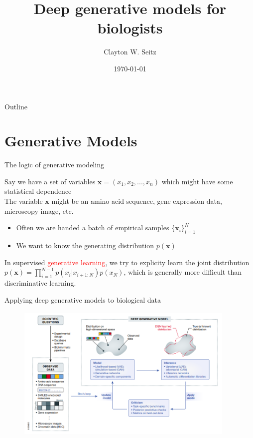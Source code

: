 \documentclass{beamer}					%
\title{Deep generative models for biologists}	%
\author{Clayton W. Seitz}								%
\date{\today}									%
\begin{document}
\begin{frame}
  \titlepage
\end{frame}

\begin{frame}{Outline}
  \tableofcontents
\end{frame}

%


\section{Generative Models}

\begin{frame}{The logic of generative modeling}

Say we have a set of variables $\mathbf{x} = (x_{1},x_{2},...,x_{n})$ which might have some statistical dependence\\
\vspace{0.1in}
The variable $\mathbf{x}$ might be an amino acid sequence, gene expression data, microscopy image, etc.\\
\vspace{0.1in}
\begin{itemize}
\item Often we are handed a batch of empirical samples $\{\mathbf{x}_{i}\}_{i=1}^{N}$
\item We want to know the generating distribution $p(\mathbf{x})$
\end{itemize}

In supervised \textcolor{red}{generative learning}, we try to explicity learn the joint distribution $p(\mathbf{x}) = \prod_{i=1}^{N-1}p(x_{i}|x_{i+1:N})p(x_{N})$, which is generally more difficult than discriminative learning. 

\end{frame}

\begin{frame}{Applying deep generative models to biological data}
\begin{figure}
\includegraphics[height=65mm, width=105mm]{dbm}
\end{figure}
\end{frame}
\end{document}
